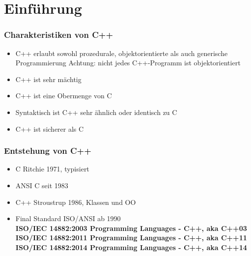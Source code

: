 
\part{Einführung}
\label{sec:Einfuehrung}


\section{Charakteristiken von C++}
\label{sec:Charakteristiken von C++}
\begin{itemize}
	\item C++ erlaubt sowohl prozedurale, objektorientierte als auch generische Programmierung
		Achtung: nicht jedes C++-Programm ist objektorientiert
	\item C++ ist sehr mächtig
	\item C++ ist eine Obermenge von C
	\item Syntaktisch ist C++ sehr ähnlich oder identisch zu C
	\item C++ ist sicherer als C
\end{itemize}

\section{Entstehung von C++}
\label{sec:Entstehung von C++}
\begin{itemize}
	\item C 					Ritchie 1971, typisiert
	\item ANSI C 				seit 1983
	\item C++ 					Stroustrup 1986, Klassen und OO
	\item Final Standard ISO/ANSI 	ab 1990 
	\vspace{3mm}
	\\ \textbf{ISO/IEC 14882:2003 Programming Languages - C++, aka C++03} 			
	\vspace{3mm}
	\\ \textbf{ISO/IEC 14882:2011 Programming Languages - C++, aka C++11}
	\vspace{3mm}
	\\ \textbf{ISO/IEC 14882:2014 Programming Languages - C++, aka C++14}
\end{itemize}

